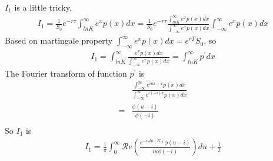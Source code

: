 \documentclass[a4paper]{article}
\begin{document}
$I_1$ is a little tricky, 
\begin{align*}
        I_1 = \frac{1}{S_0} e^{-r \tau}\int_{lnK}^{\infty} e^x p(x) dx
	  = \frac{1}{S_0} e^{-r \tau}\frac{\int_{lnK}^{\infty} e^x p(x) dx}{\int_{-\infty}^{\infty} e^x p(x) dx}
	  \int_{-\infty}^{\infty} e^x p(x) dx
\end{align*}
Based on martingale property $\int_{-\infty}^{\infty} e^x p(x) dx = e^{rT}S_0$, so
\begin{align*}
	I_1 = \int_{lnK}^{\infty} \frac{e^x p(x) dx}{\int_{-\infty}^{\infty} e^x p(x) dx}
	 =  \int_{lnK}^{\infty} {p}^{'} dx
\end{align*}
The Fourier transform of function ${p}^{'}$ is
\begin{align*}
	&\frac{\int_{-\infty}^{\infty} e^{iux + x}p(x)dx}{\int_{-\infty}^{\infty} e^{i(-i)x} p(x) dx} \\
	=&\frac{\phi(u-i)}{\phi(-i)}\\
\end{align*}
So $I_1$ is
\begin{align*}
	I_1 = \frac{1}{\pi} \int_{0}^{\infty}\mathcal Re(\frac{e^{-iuln(K)}\phi(u-i)}{iu\phi(-i)})du +\frac{1}{2} \\
\end{align*}
\end{document}
